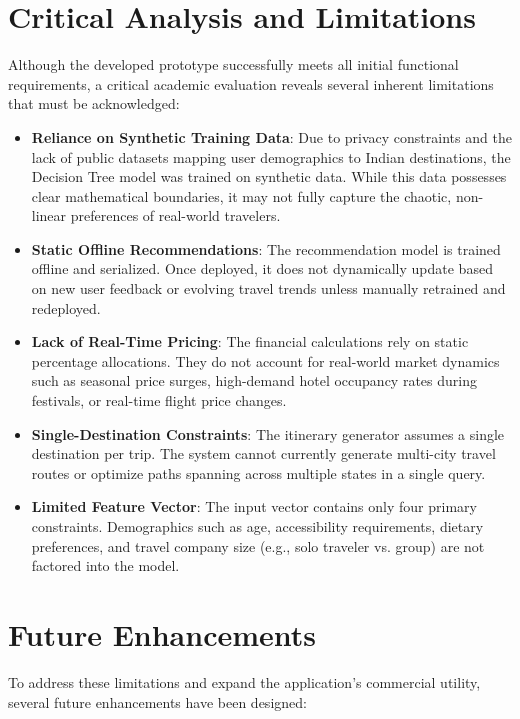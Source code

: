 \section{Critical Analysis and Limitations}

Although the developed prototype successfully meets all initial functional requirements, a critical academic evaluation reveals several inherent limitations that must be acknowledged:

\begin{itemize}
    \item \textbf{Reliance on Synthetic Training Data}: Due to privacy constraints and the lack of public datasets mapping user demographics to Indian destinations, the Decision Tree model was trained on synthetic data. While this data possesses clear mathematical boundaries, it may not fully capture the chaotic, non-linear preferences of real-world travelers.
    \item \textbf{Static Offline Recommendations}: The recommendation model is trained offline and serialized. Once deployed, it does not dynamically update based on new user feedback or evolving travel trends unless manually retrained and redeployed.
    \item \textbf{Lack of Real-Time Pricing}: The financial calculations rely on static percentage allocations. They do not account for real-world market dynamics such as seasonal price surges, high-demand hotel occupancy rates during festivals, or real-time flight price changes.
    \item \textbf{Single-Destination Constraints}: The itinerary generator assumes a single destination per trip. The system cannot currently generate multi-city travel routes or optimize paths spanning across multiple states in a single query.
    \item \textbf{Limited Feature Vector}: The input vector contains only four primary constraints. Demographics such as age, accessibility requirements, dietary preferences, and travel company size (e.g., solo traveler vs. group) are not factored into the model.
\end{itemize}

\section{Future Enhancements}

To address these limitations and expand the application's commercial utility, several future enhancements have been designed:

